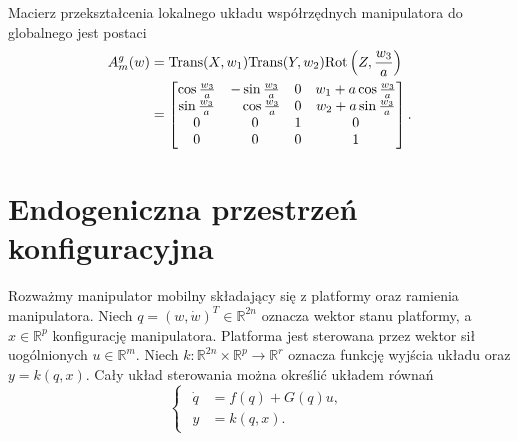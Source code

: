 Macierz przekształcenia lokalnego układu współrzędnych manipulatora do globalnego jest postaci
\begin{equation}
\begin{aligned}
A_m^g(w)&=\mathrm{Trans}(X, w_1)\mathrm{Trans}(Y, w_2)\mathrm{Rot}\left(Z, \frac{w_3}{a}\right)\\
&= \begin{bmatrix}
\cos \frac{w_3}{a} & -\sin \frac{w_3}{a} & 0 & w_1+a\cos \frac{w_3}{a}\\
\sin \frac{w_3}{a} & \phantom{-}\cos \frac{w_3}{a} & 0 & w_2+a\sin \frac{w_3}{a}\\
0 & 0 & 1 & 0\\
0 & 0 & 0 & 1
\end{bmatrix}.
\end{aligned}
\end{equation}

\section{Endogeniczna przestrzeń konfiguracyjna}
\hspace{\parindent}Rozważmy manipulator mobilny składający się z platformy oraz ramienia manipulatora. Niech $q = (w, \dot w)^T \in \mathbb{R}^{2n}$ oznacza wektor stanu platformy, a $x \in \mathbb{R}^p$ konfigurację manipulatora. Platforma jest sterowana przez wektor sił uogólnionych $u \in \mathbb{R}^m$. Niech $k: \mathbb{R}^{2n} \times \mathbb{R}^p \rightarrow \mathbb{R}^r$ oznacza funkcję wyjścia układu oraz $y=k(q,x)$.
Cały układ sterowania można określić układem równań
\begin{equation}
\begin{cases}
\begin{aligned}
\dot q &= f(q) + G(q)u,\\
y &= k(q, x).
\end{aligned}
\end{cases}
\end{equation}


